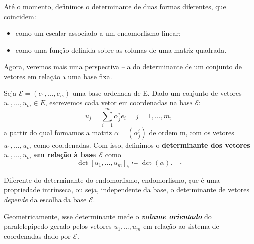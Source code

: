 \documentclass[../differential_forms.tex]{subfiles}
\begin{document}
Até o momento, definimos o determinante de duas formas diferentes, que coincidem:
\begin{itemize}
	\item como um escalar associado a um endomorfismo linear;
	\item como uma função definida sobre as colunas de uma matriz quadrada.
\end{itemize}
Agora, veremos mais uma perspectiva -- a do determinante de um conjunto de vetores em relação a uma base fixa.
\begin{def*}
	Seja \(\mathcal{E}=(e_1,\dotsc , e_{m})\) uma base ordenada de E. Dado um conjunto de vetores \(u_1, \dotsc , u_{m}\in E\), escrevemos cada vetor em coordenadas na base \(\mathcal{E}:\)
	\[
		u_{j}=\sum\limits_{i=1}^{m} \alpha_{j}^{i}e_{i},\quad j=1,\dotsc ,m,
	\]
	a partir do qual formamos a matriz \(\alpha =(\alpha_{j}^{i})\) de ordem m, com os vetores \(u_1,\dotsc , u_{m}\) como coordenadas. Com isso, definimos o \textbf{determinante dos vetores \(u_1,\dotsc , u_{m}\) em relação à base \(\mathcal{E}\)} como
	\[
		\det{[u_{1},\dotsc , u_{m}]}_{\mathcal{E}}\coloneqq \det{(\alpha )}. \quad \square
	\]
\end{def*}
\begin{tcolorbox}[
		skin=enhanced,
		title=Observação,
		fonttitle=\bfseries,
		colframe=black,
		colbacktitle=cyan!75!white,
		colback=cyan!15,
		colbacklower=black,
		coltitle=black,
		drop fuzzy shadow,
	]
	Diferente do determinante do endomorfismo, endomorfismo, que é uma propriedade intrínseca, ou seja, independente da base, o determinante de vetores \textit{depende} da escolha da base \(\mathcal{E}.\)

	Geometricamente, esse determinante mede o \textit{\textbf{volume orientado}} do paralelepípedo gerado pelos vetores \(u_1,\dotsc , u_{m}\) em relação ao sistema de coordenadas dado por \(\mathcal{E}.\)
\end{tcolorbox}
\end{document}
